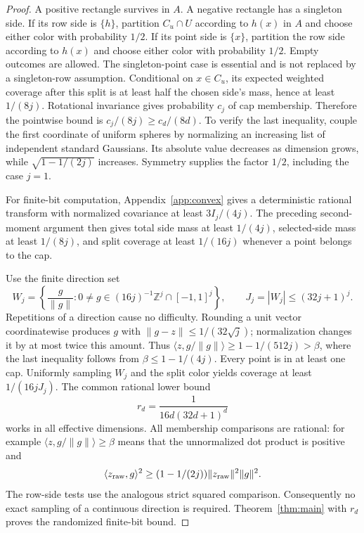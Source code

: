 \documentclass[11pt]{article}
\newcommand{\1}{\mathbf 1}
\begin{document}
\begin{proof}
A positive rectangle survives in $A$. A negative rectangle has a singleton side. If its row side is $\{h\}$, partition $C_u\cap U$ according to $h(x)$ in $A$ and choose either color with probability $1/2$. If its point side is $\{x\}$, partition the row side according to $h(x)$ and choose either color with probability $1/2$. Empty outcomes are allowed. The singleton-point case is essential and is not replaced by a singleton-row assumption. Conditional on $x\in C_u$, its expected weighted coverage after this split is at least half the chosen side's mass, hence at least $1/(8j)$. Rotational invariance gives probability $c_j$ of cap membership. Therefore the pointwise bound is $c_j/(8j)\ge c_d/(8d)$. To verify the last inequality, couple the first coordinate of uniform spheres by normalizing an increasing list of independent standard Gaussians. Its absolute value decreases as dimension grows, while $\sqrt{1-1/(2j)}$ increases. Symmetry supplies the factor $1/2$, including the case $j=1$.

For finite-bit computation, Appendix~\ref{app:convex} gives a deterministic rational transform with normalized covariance at least $3I_j/(4j)$. The preceding second-moment argument then gives total side mass at least $1/(4j)$, selected-side mass at least $1/(8j)$, and split coverage at least $1/(16j)$ whenever a point belongs to the cap.

Use the finite direction set
\[
 W_j=\left\{\frac{g}{\|g\|}:0\ne g\in(16j)^{-1}\mathbb Z^j\cap[-1,1]^j\right\},
 \qquad J_j=|W_j|\le(32j+1)^j.
\]
Repetitions of a direction cause no difficulty. Rounding a unit vector coordinatewise produces $g$ with $\|g-z\|\le1/(32\sqrt j)$; normalization changes it by at most twice this amount. Thus $\langle z,g/\|g\|\rangle\ge1-1/(512j)>\beta$, where the last inequality follows from $\beta\le1-1/(4j)$. Every point is in at least one cap. Uniformly sampling $W_j$ and the split color yields coverage at least $1/(16jJ_j)$. The common rational lower bound
\begin{equation}\label{eq:netr}
 r_d=\frac1{16d(32d+1)^d}
\end{equation}
works in all effective dimensions. All membership comparisons are rational: for example $\langle z,g/\|g\|\rangle\ge\beta$ means that the unnormalized dot product is positive and
\[
 \langle z_{\rm raw},g\rangle^2\ge(1-1/(2j))\|z_{\rm raw}\|^2\|g\|^2.
\] The row-side tests use the analogous strict squared comparison. Consequently no exact sampling of a continuous direction is required. Theorem~\ref{thm:main} with $r_d$ proves the randomized finite-bit bound.


\end{proof}
\end{document}
